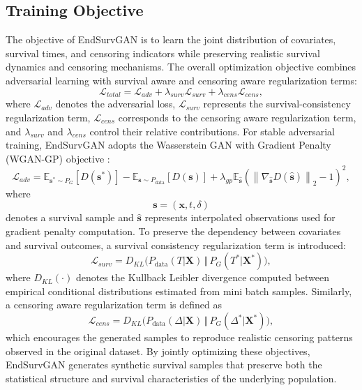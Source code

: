 \documentclass[twoside]{article}
\begin{document}
\subsection{Training Objective}
The objective of EndSurvGAN is to learn the joint distribution of covariates, survival times, and censoring indicators while preserving realistic survival dynamics and censoring mechanisms. The overall optimization objective combines adversarial learning with survival aware and censoring aware regularization terms:
\begin{equation}
	\mathcal{L}_{total}
	=
	\mathcal{L}_{adv}
	+
	\lambda_{surv}\mathcal{L}_{surv}
	+
	\lambda_{cens}\mathcal{L}_{cens},
\end{equation}
where \(\mathcal{L}_{adv}\) denotes the adversarial loss, \(\mathcal{L}_{surv}\) represents the survival-consistency regularization term, \(\mathcal{L}_{cens}\) corresponds to the censoring aware regularization term, and \(\lambda_{surv}\) and \(\lambda_{cens}\) control their relative contributions.
For stable adversarial training, EndSurvGAN adopts the Wasserstein GAN with Gradient Penalty (WGAN-GP) objective \cite{Gulrajani2017}:
\begin{equation}
	\mathcal{L}_{adv}
	=
	\mathbb{E}_{\mathbf{s}^{*}\sim P_G}
	\left[
	D(\mathbf{s}^{*})
	\right]
	-
	\mathbb{E}_{\mathbf{s}\sim P_{\mathrm{data}}}
	\left[
	D(\mathbf{s})
	\right]
	+
	\lambda_{gp}
	\mathbb{E}_{\hat{\mathbf{s}}}
	\left(
	\left\|
	\nabla_{\hat{\mathbf{s}}}
	D(\hat{\mathbf{s}})
	\right\|_2
	-1
	\right)^2,
\end{equation}
where
\[
\mathbf{s}=(\mathbf{x},t,\delta)
\]
denotes a survival sample and \(\hat{\mathbf{s}}\) represents interpolated observations used for gradient penalty computation.
To preserve the dependency between covariates and survival outcomes, a survival consistency regularization term is introduced:
\begin{equation}
	\mathcal{L}_{surv}
	=
	D_{KL}
	\Big(
	P_{\mathrm{data}}(T|\mathbf{X})
	\,\Vert\,
	P_G(T^{*}|\mathbf{X}^{*})
	\Big),
\end{equation}
where \(D_{KL}(\cdot)\) denotes the Kullback Leibler divergence computed between empirical conditional distributions estimated from mini batch samples.
Similarly, a censoring aware regularization term is defined as
\begin{equation}
	\mathcal{L}_{cens}
	=
	D_{KL}
	\Big(
	P_{\mathrm{data}}(\Delta|\mathbf{X})
	\,\Vert\,
	P_G(\Delta^{*}|\mathbf{X}^{*})
	\Big),
\end{equation}
which encourages the generated samples to reproduce realistic censoring patterns observed in the original dataset.
By jointly optimizing these objectives, EndSurvGAN generates synthetic survival samples that preserve both the statistical structure and survival characteristics of the underlying population.
\end{document}

